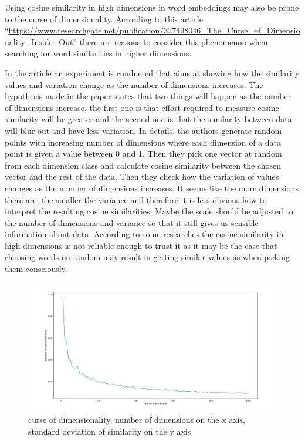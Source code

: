 \documentclass[12pt,]{book}
\begin{document}
Using cosine similarity in high dimensions in word embeddings may also
be prone to the curse of dimensionality. According to this article
``\url{https://www.researchgate.net/publication/327498046_The_Curse_of_Dimensionality_Inside_Out}''
there are reasons to consider this phenomenon when searching for word
similarities in higher dimensions.

In the article an experiment is conducted that aims at showing how the
similarity values and variation change as the number of dimensions
increases. The hypothesis made in the paper states that two things will
happen as the number of dimensions increase, the first one is that
effort required to measure cosine similarity will be greater and the
second one is that the similarity between data will blur out and have
less variation. In details, the authors generate random points with
increasing number of dimensions where each dimension of a data point is
given a value between 0 and 1. Then they pick one vector at random from
each dimension class and calculate cosine similarity between the chosen
vector and the rest of the data. Then they check how the variation of
values changes as the number of dimensions increases. It seems like the
more dimensions there are, the smaller the variance and therefore it is
less obvious how to interpret the resulting cosine similarities. Maybe
the scale should be adjusted to the number of dimensions and variance so
that it still gives us sensible information about data. According to
some researches the cosine similarity in high dimensions is not reliable
enough to trust it as it may be the case that choosing words on random
may result in getting similar values as when picking them consciously.

\begin{figure}
\centering
\includegraphics{../images/curseOfDimensionality.png}
\caption{curse of dimensionality, number of dimensions on the x axis,
standard deviation of similarity on the y axis}
\end{figure}
\end{document}
